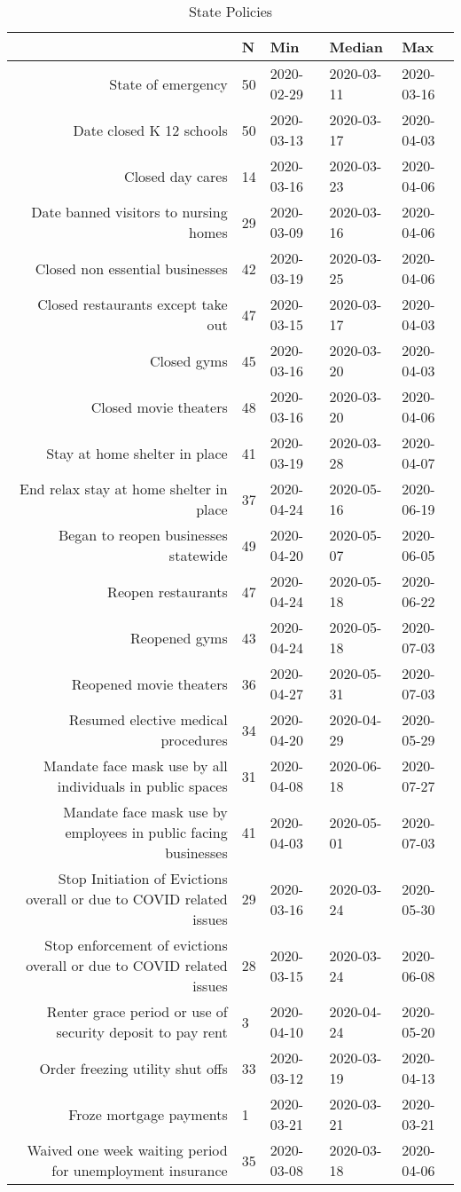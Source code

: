 \begin{table}[ht]
\centering
\begin{tabular}{rllll}
  \hline
 & N & Min & Median & Max \\ 
  \hline
State of emergency & 50 & 2020-02-29 & 2020-03-11 & 2020-03-16 \\ 
  Date closed K 12 schools & 50 & 2020-03-13 & 2020-03-17 & 2020-04-03 \\ 
  Closed day cares & 14 & 2020-03-16 & 2020-03-23 & 2020-04-06 \\ 
  Date banned visitors to nursing homes & 29 & 2020-03-09 & 2020-03-16 & 2020-04-06 \\ 
  Closed non essential businesses & 42 & 2020-03-19 & 2020-03-25 & 2020-04-06 \\ 
  Closed restaurants except take out & 47 & 2020-03-15 & 2020-03-17 & 2020-04-03 \\ 
  Closed gyms & 45 & 2020-03-16 & 2020-03-20 & 2020-04-03 \\ 
  Closed movie theaters & 48 & 2020-03-16 & 2020-03-20 & 2020-04-06 \\ 
  Stay at home  shelter in place & 41 & 2020-03-19 & 2020-03-28 & 2020-04-07 \\ 
  End relax stay at home shelter in place & 37 & 2020-04-24 & 2020-05-16 & 2020-06-19 \\ 
  Began to reopen businesses statewide & 49 & 2020-04-20 & 2020-05-07 & 2020-06-05 \\ 
  Reopen restaurants & 47 & 2020-04-24 & 2020-05-18 & 2020-06-22 \\ 
  Reopened gyms & 43 & 2020-04-24 & 2020-05-18 & 2020-07-03 \\ 
  Reopened movie theaters & 36 & 2020-04-27 & 2020-05-31 & 2020-07-03 \\ 
  Resumed elective medical procedures & 34 & 2020-04-20 & 2020-04-29 & 2020-05-29 \\ 
  Mandate face mask use by all individuals in public spaces & 31 & 2020-04-08 & 2020-06-18 & 2020-07-27 \\ 
  Mandate face mask use by employees in public facing businesses & 41 & 2020-04-03 & 2020-05-01 & 2020-07-03 \\ 
  Stop Initiation of Evictions overall or due to COVID related issues & 29 & 2020-03-16 & 2020-03-24 & 2020-05-30 \\ 
  Stop enforcement of evictions overall or due to COVID related issues & 28 & 2020-03-15 & 2020-03-24 & 2020-06-08 \\ 
  Renter grace period or use of security deposit to pay rent & 3 & 2020-04-10 & 2020-04-24 & 2020-05-20 \\ 
  Order freezing utility shut offs & 33 & 2020-03-12 & 2020-03-19 & 2020-04-13 \\ 
  Froze mortgage payments & 1 & 2020-03-21 & 2020-03-21 & 2020-03-21 \\ 
  Waived one week waiting period for unemployment insurance & 35 & 2020-03-08 & 2020-03-18 & 2020-04-06 \\ 
   \hline
\end{tabular}
\caption{State Policies \label{tab:policies}} 
\end{table}
